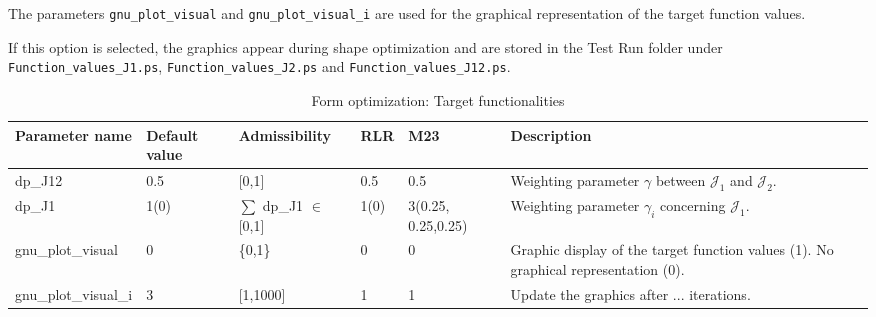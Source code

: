 \documentclass[oneside]{article}
\numberwithin{equation}{section}
\numberwithin{figure}{section}
\newcommand{\JJ }{ \mathcal{J}}
\numberwithin{figure}{section}
\begin{document}
The parameters \verb|gnu_plot_visual| and \verb|gnu_plot_visual_i| are used for the graphical representation of the target function values.

If this option is selected, the graphics appear during shape optimization and are stored in the Test Run folder under \verb|Function_values_J1.ps|, \verb|Function_values_J2.ps| and \verb|Function_values_J12.ps|.
\begin{table}[h]
    \centering
    \begin{tabular}{|p{2.5cm}|p{1cm}|p{1.6cm}|p{0.6cm}|p{1.3cm}|p{4cm}|} %
        \hline
        \cellcolor{light-gray} Parameter name & \cellcolor{light-gray} Default value & \cellcolor{light-gray} Admissibility & \cellcolor{light-gray} RLR & \cellcolor{light-gray} M23 & \cellcolor{light-gray} Description\\
        \hline
        dp\_J12              &  0.5    & [0,1]    & 0.5   & 0.5 & Weighting parameter $\gamma$ between $\JJ_1$ and $\JJ_2$.\\
        \hline
        dp\_J1              &  1(0)    & $\sum$ dp\_J1 $\in$ [0,1]    & 1(0)   & 3(0.25, 0.25,0.25) & Weighting parameter $\gamma_i$ concerning $\JJ_{1}$.\\
        \hline
        gnu\_plot\_visual    &  0      & \{0,1\}  & 0     & 0 & Graphic display of the target function values (1). No graphical representation (0).\\
        \hline
        gnu\_plot\_visual\_i &  3      & [1,1000] & 1     & 1 & Update the graphics after ... iterations.\\      
        \hline
    \end{tabular}
    \caption{Form optimization: Target functionalities}\label{tab:parameter4}
\end{table}
\end{document}
